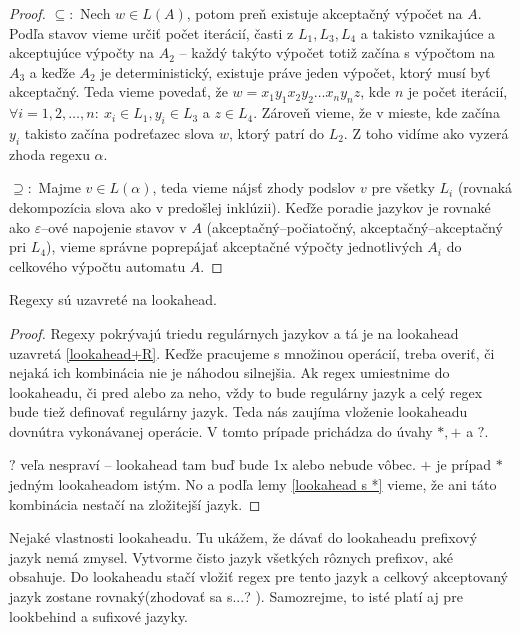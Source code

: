 \begin{proof}
$\subseteq:$ Nech $w \in L(A)$, potom preň existuje akceptačný výpočet na $A$. Podľa stavov vieme určiť počet iterácií, časti z $L_1,L_3,L_4$ a takisto vznikajúce a akceptujúce výpočty na $A_2$ -- každý takýto výpočet totiž začína s výpočtom na $A_3$ a keďže $A_2$ je deterministický, existuje práve jeden výpočet, ktorý musí byť akceptačný. Teda vieme povedať, že $w = x_1y_1x_2y_2 \dots x_ny_nz$, kde $n$ je počet iterácií, $\forall i = 1, 2, \dots, n : ~ x_i \in L_1, y_i \in L_3 $ a $z \in L_4$. Zároveň vieme, že v mieste, kde začína $y_i$ takisto začína podreťazec slova $w$, ktorý patrí do $L_2$. Z toho vidíme ako vyzerá zhoda regexu $\alpha$.

$\supseteq:$ Majme $v \in L(\alpha)$, teda vieme nájsť zhody podslov $v$ pre všetky $L_i$ (rovnaká dekompozícia slova ako v predošlej inklúzii). Keďže poradie jazykov je rovnaké ako $\varepsilon$--ové napojenie stavov v $A$ (akceptačný--počiatočný, akceptačný--akceptačný pri $L_4$), vieme správne poprepájať akceptačné výpočty jednotlivých $A_i$ do celkového výpočtu automatu $A$.
\end{proof}

\begin{veta}
Regexy sú uzavreté na lookahead.
\end{veta}
\begin{proof}
Regexy pokrývajú triedu regulárnych jazykov a tá je na lookahead uzavretá \ref{lookahead+R}. Keďže pracujeme s množinou operácií, treba overiť, či nejaká ich kombinácia nie je náhodou silnejšia. Ak regex umiestnime do lookaheadu, či pred alebo za neho, vždy to bude regulárny jazyk a celý regex bude tiež definovať regulárny jazyk. Teda nás zaujíma vloženie lookaheadu dovnútra vykonávanej operácie. V tomto prípade prichádza do úvahy $*,+$ a $?$.

$?$ veľa nespraví -- lookahead tam buď bude 1x alebo nebude vôbec. $+$ je prípad $*$ jedným lookaheadom istým. No a podľa lemy \ref{lookahead s *} vieme, že ani táto kombinácia nestačí na zložitejší jazyk.
\end{proof}

Nejaké vlastnosti lookaheadu.
Tu ukážem, že dávať do lookaheadu prefixový jazyk nemá zmysel. Vytvorme čisto jazyk všetkých rôznych prefixov, aké obsahuje. Do lookaheadu stačí vložiť regex pre tento jazyk a celkový akceptovaný jazyk zostane rovnaký(zhodovať sa s...? \todo). Samozrejme, to isté platí aj pre lookbehind a sufixové jazyky.

